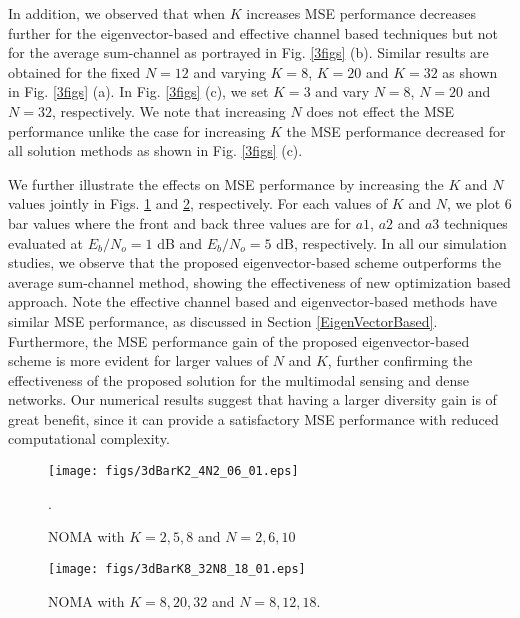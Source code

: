 \documentclass[journal]{IEEEtran}
\theoremstyle{definition}
\begin{document}
 In addition, we observed that when $K$ increases MSE performance decreases further for the eigenvector-based and effective channel based techniques but not for the average sum-channel as portrayed in Fig. \ref{3figs} (b). Similar results are obtained for the fixed $N=12$ and varying $K=8$, $K=20$ and $K=32$ as shown in Fig. \ref{3figs} (a). In Fig. \ref{3figs} (c), we set $K=3$ and vary $N=8$, $N=20$ and $N=32$, respectively. We note that increasing $N$ does not effect the MSE performance unlike the case for increasing $K$ the MSE performance decreased for all solution methods as shown in Fig. \ref{3figs} (c). 
 
 We further illustrate the effects on MSE performance by increasing the $K$ and $N$ values jointly in Figs. \ref{3dBarK2_4N2_06_01} and \ref{3dBarK8_32N8_18_01}, respectively. For each values of $K$ and $N$, we plot $6$ bar values where the front and back three values are for $a1$, $a2$ and $a3$ techniques evaluated at $E_b/N_o=1$ dB and $E_b/N_o=5$ dB, respectively. In all our simulation studies, we observe that the proposed eigenvector-based scheme outperforms the average sum-channel method, showing the effectiveness of new optimization based approach. Note the effective channel based and eigenvector-based methods have similar MSE performance, as discussed in Section \ref{EigenVectorBased}. Furthermore, the MSE performance gain of the proposed eigenvector-based scheme is more evident for larger values of $N$ and $K$, further confirming the effectiveness of the proposed solution for the multimodal sensing and dense networks. Our numerical results suggest that having a larger diversity gain is of great benefit, since it can provide a satisfactory MSE performance with reduced computational complexity.%
    \vspace{-0.6cm}
\begin{center}
	\begin{figure}[tb]
		\centering
		\texttt{[image: figs/3dBarK2\_4N2\_06\_01.eps]}\vspace{-0.1cm}
		\centering \caption{NOMA with $K = 2, 5, 8$ and $N = 2,6,10$}. \label{3dBarK2_4N2_06_01}
		\vspace{-0.2cm} 
	\end{figure}
\end{center}
 
\vspace{-0.4cm}

 \begin{center}
	\begin{figure}[tb]
		\centering
		\texttt{[image: figs/3dBarK8\_32N8\_18\_01.eps]}\vspace{-0.1cm}
		\centering \caption{NOMA with $K = 8, 20, 32$ and $N = 8,12,18$.} \label{3dBarK8_32N8_18_01} \vspace{-0.2cm}
	\end{figure}
\end{center}
\end{document}
